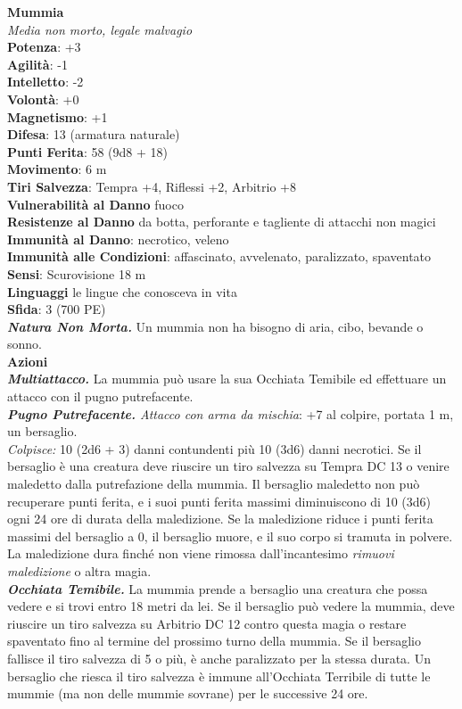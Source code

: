 \begin{multicols}{2}
\medskip\textbf{Mummia}\\
\emph{Media non morto, legale malvagio}\\
\textbf{Potenza}: +3\\
\textbf{Agilità}: -1\\
\textbf{Intelletto}: -2\\
\textbf{Volontà}: +0\\
\textbf{Magnetismo}: +1\\
\textbf{Difesa}: 13 (armatura naturale)\\
\textbf{Punti Ferita}: 58 (9d8 + 18)\\
\textbf{Movimento}: 6 m\\
\textbf{Tiri Salvezza}: Tempra +4, Riflessi +2, Arbitrio +8\\
\textbf{Vulnerabilità al Danno} fuoco\\
\textbf{Resistenze al Danno} da botta, perforante e tagliente di attacchi non magici\\
\textbf{Immunità al Danno}: necrotico, veleno\\
\textbf{Immunità alle Condizioni}: affascinato, avvelenato, paralizzato, spaventato\\
\textbf{Sensi}: Scurovisione 18 m \\
\textbf{Linguaggi} le lingue che conosceva in vita\\
\textbf{Sfida}: 3 (700 PE)\smallskip\\
\emph{\textbf{Natura Non Morta.}} Un mummia non ha bisogno di aria, cibo, bevande o sonno.\\
\smallskip\textbf{Azioni}\\
\emph{\textbf{Multiattacco.}} La mummia può usare la sua Occhiata Temibile ed effettuare un attacco con il pugno putrefacente.\\

\emph{\textbf{Pugno Putrefacente.} Attacco con arma da mischia}: +7 al colpire, portata 1 m, un bersaglio.\\

\emph{Colpisce:} 10 (2d6 + 3) danni contundenti più 10 (3d6) danni necrotici. Se il bersaglio è una creatura deve riuscire un tiro salvezza su Tempra DC  13 o venire maledetto dalla putrefazione della mummia. Il bersaglio maledetto non può recuperare punti ferita, e i suoi punti ferita massimi diminuiscono di 10 (3d6) ogni 24 ore di durata della maledizione. Se la maledizione riduce i punti ferita massimi del bersaglio a 0, il bersaglio muore, e il suo corpo si tramuta in polvere. La maledizione dura finché non viene rimossa dall'incantesimo \emph{rimuovi maledizione} o altra magia.\\
\emph{\textbf{Occhiata Temibile.}} La mummia prende a bersaglio una creatura che possa vedere e si trovi entro 18 metri da lei. Se il bersaglio può vedere la mummia, deve riuscire un tiro salvezza su Arbitrio DC  12 contro questa magia o restare spaventato fino al termine del prossimo turno della mummia. Se il bersaglio fallisce il tiro salvezza di 5 o più, è anche paralizzato per la stessa durata. Un bersaglio che riesca il tiro salvezza è immune all'Occhiata Terribile di tutte le mummie (ma non delle mummie sovrane) per le successive 24 ore.\\


\end{multicols}
